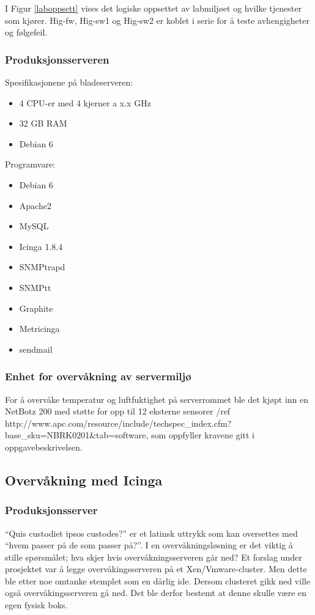 I Figur \ref{laboppsett} vises det logiske oppsettet av labmiljøet og hvilke tjenester som kjører. Hig-fw, Hig-sw1 og Hig-sw2 er koblet i serie for å teste avhengigheter og følgefeil.

\subsubsection{Produksjonsserveren}
Spesifikasjonene på bladeserveren:
\begin{itemize}
\item 4 CPU-er med 4 kjerner a x.x GHz
\item 32 GB RAM
\item Debian 6
\end{itemize}
Programvare:
\begin{itemize}
\item Debian 6
\item Apache2
\item MySQL
\item Icinga 1.8.4
\item SNMPtrapd
\item SNMPtt
\item Graphite
\item Metricinga 
\item sendmail
\end{itemize}
\subsubsection{Enhet for overvåkning av servermiljø}
For å overvåke temperatur og luftfuktighet på serverrommet ble det kjøpt inn en NetBotz 200 med støtte for opp til 12 eksterne sensorer /ref http://www.apc.com/resource/include/techspec\_index.cfm?base\_sku=NBRK0201\&tab=software,
som oppfyller kravene gitt i oppgavebeskrivelsen. 

\subsection{Overvåkning med Icinga}
\subsubsection{Produksjonsserver}
“Quis custodiet ipsos custodes?” er et latinsk uttrykk som kan oversettes med “hvem passer på de som passer på?”. I en overvåkningsløsning er det viktig å stille spørsmålet; hva skjer hvis overvåkningsserveren går ned? Et forslag under prosjektet var å legge overvåkingsserveren på et Xen/Vmware-cluster. Men dette ble etter noe omtanke stemplet som en dårlig ide. Dersom clusteret gikk ned ville også overvåkingsserveren gå ned. Det ble derfor bestemt at denne skulle være en egen fysisk boks. 

